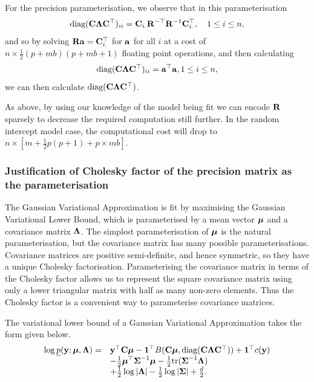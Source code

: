 For the precision parameterisation, we observe that in this parameterisation
\begin{equation*}
	\text{diag}({\bf C} {\boldsymbol \Lambda} {\bf C}^\top)_{ii} = {\bf C}_{i .} {\bf R}^{-\top} {\bf R}^{-1} {\bf C}_{i .}^\top,\quad 1 \leq i \leq n,
\end{equation*}
\noindent and so by solving ${\bf R} {\bf a} = {\bf C}_{i .}^\top$ for ${\bf a}$ for all $i$ at a cost of $n \times
\frac{1}{2} (p + m b) (p + m b + 1)$ floating point operations, and then calculating
\begin{equation*}
	\text{diag}({\bf C} {\boldsymbol \Lambda} {\bf C}^\top)_{ii} = {\bf a}^\top {\bf a}, 1 \leq i \leq n,
\end{equation*}
\noindent we can then calculate $\text{diag}({\bf C} {\boldsymbol \Lambda} {\bf C}^\top)$.
	
As above, by using our knowledge of the model being fit we can encode ${\bf R}$
sparsely to decrease the required computation still further. In the random
intercept model case, the computational cost will drop to $n \times [m +
\frac{1}{2} p (p + 1) + p \times m b]$.
			
\subsubsection{Justification of Cholesky factor of the precision matrix as the
parameterisation}

The Gaussian Variational Approximation is fit by maximising the Gaussian
Variational Lower Bound, which is parameterised by a mean vector ${\boldsymbol \mu}$ and a
covariance matrix ${\boldsymbol \Lambda}$. The simplest parameterisation of ${\boldsymbol \mu}$ is the
natural parameterisation, but the covariance matrix has many possible
parameterisations. Covariance matrices are positive semi-definite, and hence
symmetric, so they have a unique Cholesky factorisation. Parameterising the
covariance matrix in terms of the Cholesky factor allows us to represent the
square covariance matrix using only a lower triangular matrix with half as many
non-zero elements. Thus the Cholesky factor is a convenient way to parameterise
covariance matrices.

The variational lower bound of a Gaussian Variational Approximation takes the
form given below.
\begin{equation}
\label{eq:gva_lower_bound_precision_param2}
\begin{array}{ll}
\log \underline{p}({\bf y}; {\boldsymbol \mu}, {\boldsymbol \Lambda}) =& {\bf y}^\top {\bf C} {\boldsymbol\mu} - {\bf 1}^\top B({\bf C} {\boldsymbol \mu}, \text{diag}({\bf C} {\boldsymbol \Lambda} {\bf C}^\top)) + {\bf 1}^\top c({\bf y}) \\
&- \tfrac{1}{2} {\boldsymbol \mu}^\top {\boldsymbol\Sigma}^{-1} {\boldsymbol \mu} - \tfrac{1}{2} \text{tr}({\boldsymbol \Sigma}^{-1} {\boldsymbol \Lambda}) \\
&+ \tfrac{1}{2} \log |{\boldsymbol \Lambda}| - \tfrac{1}{2} \log |{\boldsymbol \Sigma}| + \tfrac{d}{2}.
\end{array}
\end{equation}

